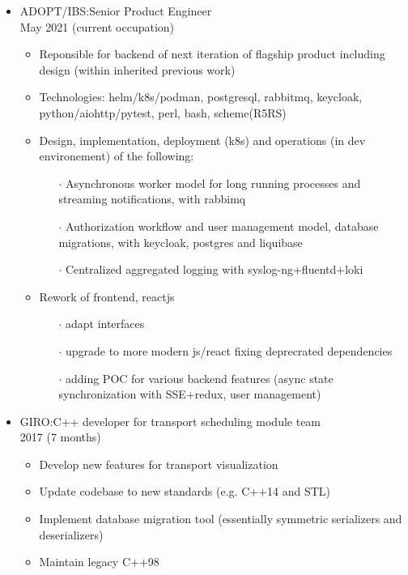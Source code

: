 \documentclass{article}
\begin{document}
\begin{itemize}
  \item ADOPT/IBS:\@ Senior Product Engineer\\ May 2021 (current occupation)

    \begin{itemize}
      \item Reponsible for backend of next iteration of flagship product including design (within inherited previous work)
      \item Technologies:
        helm/k8s/podman, postgresql, rabbitmq, keycloak, python/aiohttp/pytest, perl, bash, scheme(R5RS)
      \item Design, implementation, deployment (k8s) and operations (in dev environement) of the following:
        \begin{itemize}
          \item[$\cdot$] Asynchronous worker model for long running processes
            and streaming notifications, with rabbimq
          \item[$\cdot$] Authorization workflow and user management model, database migrations,
            with keycloak, postgres and liquibase
          \item[$\cdot$] Centralized aggregated logging with syslog-ng+fluentd+loki
        \end{itemize}
      \item Rework of frontend, reactjs
        \begin{itemize}
          \item[$\cdot$] adapt interfaces
          \item[$\cdot$] upgrade to more modern js/react fixing deprecrated dependencies
          \item[$\cdot$] adding POC for various backend features (async state synchronization with SSE+redux, user management)
        \end{itemize}

    \end{itemize}

  \item GIRO:\@ C++ developer for transport scheduling module team \\ 2017 (7 months)
    \begin{itemize}
      \item Develop new features for transport visualization
      \item Update codebase to new standards (e.g. C++14 and STL)
      \item Implement database migration tool (essentially symmetric serializers and deserializers)
      \item Maintain legacy C++98
    \end{itemize}


\end{itemize}
\end{document}
